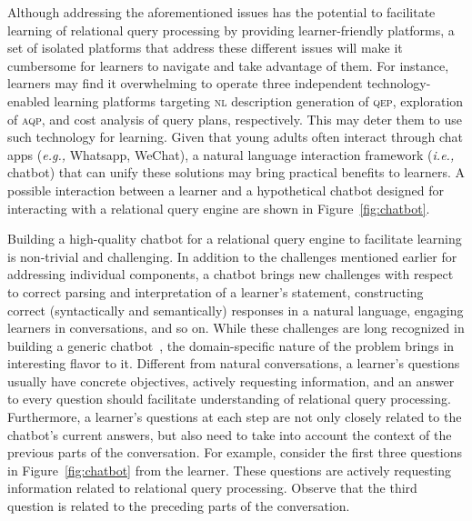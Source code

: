 \documentclass[11pt]{article}
\newcommand{\ie}{\emph{i.e.,}\xspace}
\newcommand{\eg}{\emph{e.g.,}\xspace}
\begin{document}
Although addressing the aforementioned issues has the potential to facilitate learning of relational query processing by providing learner-friendly platforms, a set of isolated platforms that address these different issues will make it cumbersome for learners to navigate and take advantage of them.  For instance, learners may find it overwhelming to operate three independent technology-enabled learning platforms targeting \textsc{nl} description generation of \textsc{qep}, exploration of \textsc{aqp}, and cost analysis of query plans, respectively. This may deter them to use such technology for learning. Given that young adults often interact through chat apps (\eg Whatsapp, WeChat), a natural language interaction framework (\ie chatbot) that can unify these solutions may bring practical benefits to learners.  A possible interaction between a learner and a hypothetical chatbot designed for interacting with a relational query engine are shown in Figure~\ref{fig:chatbot}.

Building a high-quality chatbot for a relational query engine to facilitate learning is non-trivial and challenging.  In addition to the challenges mentioned earlier for addressing individual components, a chatbot brings new challenges with respect to correct parsing and interpretation of a learner's statement, constructing correct (syntactically and semantically) responses in a natural language, engaging learners in conversations, and so on. While these challenges are long recognized in building a generic chatbot~\cite{GGL18}, the domain-specific nature of the problem brings in interesting flavor to it. Different from natural conversations, a learner’s questions usually have concrete objectives, actively requesting information, and an answer to every question should facilitate understanding of relational query processing. Furthermore, a learner's questions at each step are not only closely related to the chatbot’s current answers, but also need to take into account the context of the previous parts of the conversation. For example, consider the first three questions in Figure~\ref{fig:chatbot} from the learner. These questions are actively requesting information related to relational query processing. Observe that the third question is related to the preceding parts of the conversation.  
\end{document}

